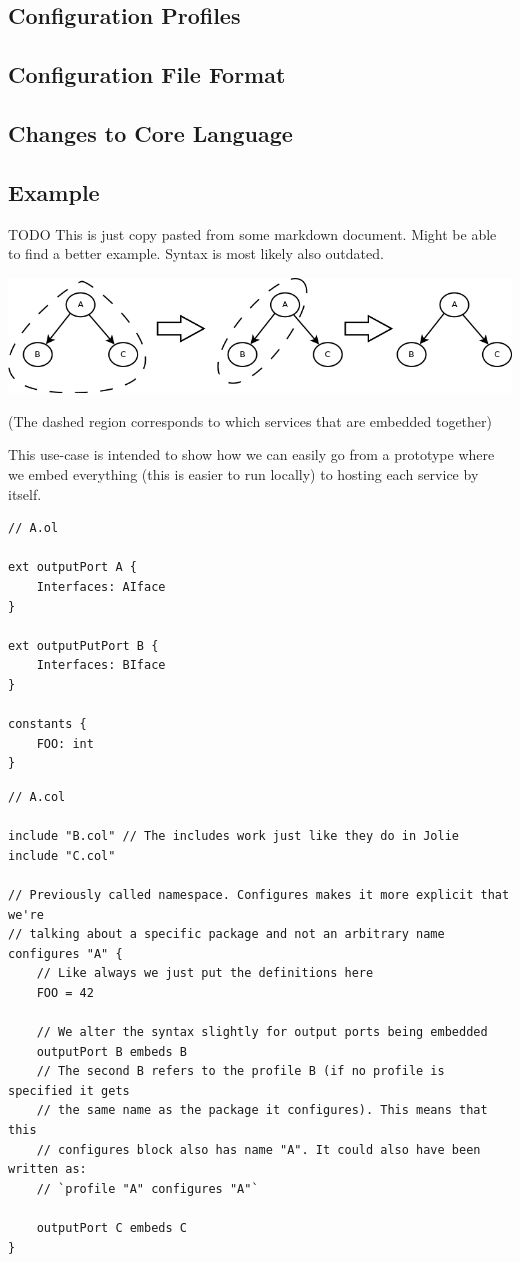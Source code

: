 \subsection{Configuration Profiles}

\subsection{Configuration File Format}

\subsection{Changes to Core Language}

\subsection{Example}

TODO This is just copy pasted from some markdown document. Might be able to
find a better example. Syntax is most likely also outdated.

\includegraphics[width=\textwidth]{prototypes.png}

(The dashed region corresponds to which services that are embedded together)

This use-case is intended to show how we can easily go from a prototype where
we embed everything (this is easier to run locally) to hosting each service by
itself.

\begin{verbatim}
// A.ol

ext outputPort A {
    Interfaces: AIface
}

ext outputPutPort B {
    Interfaces: BIface
}

constants {
    FOO: int
}
\end{verbatim}

\begin{verbatim}
// A.col

include "B.col" // The includes work just like they do in Jolie
include "C.col"

// Previously called namespace. Configures makes it more explicit that we're
// talking about a specific package and not an arbitrary name
configures "A" {
    // Like always we just put the definitions here
    FOO = 42

    // We alter the syntax slightly for output ports being embedded
    outputPort B embeds B
    // The second B refers to the profile B (if no profile is specified it gets
    // the same name as the package it configures). This means that this
    // configures block also has name "A". It could also have been written as:
    // `profile "A" configures "A"`

    outputPort C embeds C
}
\end{verbatim}

